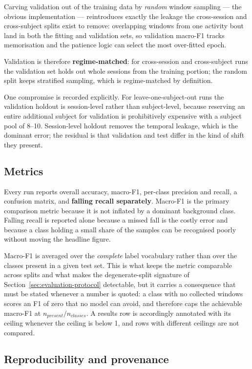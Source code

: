 Carving validation out of the training data by \emph{random} window
sampling --- the obvious implementation --- reintroduces exactly the leakage
the cross-session and cross-subject splits exist to remove: overlapping
windows from one activity bout land in both the fitting and validation sets,
so validation macro-F1 tracks memorisation and the patience logic can select
the most over-fitted epoch.

Validation is therefore \textbf{regime-matched}: for cross-session and
cross-subject runs the validation set holds out whole sessions from the
training portion; the random split keeps stratified sampling, which is
regime-matched by definition.

One compromise is recorded explicitly. For leave-one-subject-out runs the
validation holdout is session-level rather than subject-level, because
reserving an entire additional subject for validation is prohibitively
expensive with a subject pool of 8--10. Session-level holdout removes the
temporal leakage, which is the dominant error; the residual is that
validation and test differ in the kind of shift they present.

\subsection{Metrics}

Every run reports overall accuracy, macro-F1, per-class precision and
recall, a confusion matrix, and \textbf{falling recall separately}. Macro-F1
is the primary comparison metric because it is not inflated by a dominant
background class. Falling recall is reported alone because a missed fall is
the costly error and because a class holding a small share of the samples
can be recognised poorly without moving the headline figure.

Macro-F1 is averaged over the \emph{complete} label vocabulary rather than
over the classes present in a given test set. This is what keeps the metric
comparable across splits and what makes the degenerate-split signature of
Section~\ref{sec:evaluation-protocol} detectable, but it carries a
consequence that must be stated whenever a number is quoted: a class with no
collected windows scores an F1 of zero that no model can avoid, and
therefore caps the achievable macro-F1 at $n_{present}/n_{classes}$. A
results row is accordingly annotated with its ceiling whenever the ceiling
is below 1, and rows with different ceilings are not compared.

\subsection{Reproducibility and provenance}

